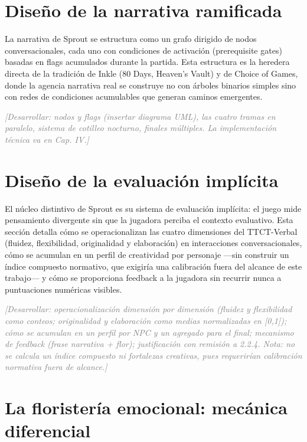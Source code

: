 \documentclass[12pt,twoside,titlepage]{report}
\begin{document}
\section{Diseño de la narrativa ramificada}

La narrativa de Sprout se estructura como un grafo dirigido de nodos conversacionales, cada uno con condiciones de activación (prerequisite gates) basadas en flags acumulados durante la partida. Esta estructura es la heredera directa de la tradición de Inkle (80 Days, Heaven's Vault) y de Choice of Games, donde la agencia narrativa real se construye no con árboles binarios simples sino con redes de condiciones acumulables que generan caminos emergentes.

\textcolor{gray}{\textit{[Desarrollar: nodos y flags (insertar diagrama UML), las cuatro tramas en paralelo, sistema de cotilleo nocturno, finales múltiples. La implementación técnica va en Cap. IV.]}}

\section{Diseño de la evaluación implícita}

El núcleo distintivo de Sprout es su sistema de evaluación implícita: el juego mide pensamiento divergente sin que la jugadora perciba el contexto evaluativo. Esta sección detalla cómo se operacionalizan las cuatro dimensiones del TTCT-Verbal (fluidez, flexibilidad, originalidad y elaboración) en interacciones conversacionales, cómo se acumulan en un perfil de creatividad por personaje ---sin construir un índice compuesto normativo, que exigiría una calibración fuera del alcance de este trabajo--- y cómo se proporciona feedback a la jugadora sin recurrir nunca a puntuaciones numéricas visibles.

\textcolor{gray}{\textit{[Desarrollar: operacionalización dimensión por dimensión (fluidez y flexibilidad como conteos; originalidad y elaboración como medias normalizadas en [0,1]); cómo se acumulan en un perfil por NPC y un agregado para el final; mecanismo de feedback (frase narrativa + flor); justificación con remisión a 2.2.4. Nota: no se calcula un índice compuesto ni fortalezas creativas, pues requerirían calibración normativa fuera de alcance.]}}

\section{La floristería emocional: mecánica diferencial}
\end{document}
